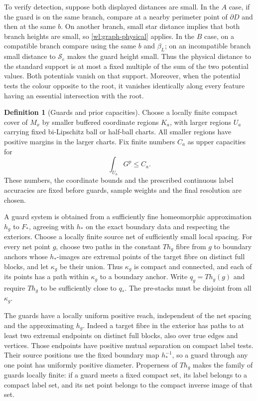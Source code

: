 \documentclass[11pt]{article}
\numberwithin{equation}{section}
\theoremstyle{definition}
\newtheorem{definition}[theorem]{Definition}
\theoremstyle{remark}
\begin{document}
To verify detection, suppose both displayed distances are small.  In
the $A$ case, if the guard is on the same branch, compare at a nearby
perimeter point of $\partial D$ and then at the same $b$.  On another
branch, small star distance implies that both branch heights are
small, so \eqref{wl:graph-physical} applies.  In the $B$ case, on a
compatible branch compare using the same $b$ and $\beta_L$; on an
incompatible branch small distance to $\mathcal S_e$ makes the guard
height small.  Thus the physical distance to the standard support is
at most a fixed multiple of the sum of the two potential values.
Both potentials vanish on that support.  Moreover, when the potential
tests the colour opposite to the root, it vanishes identically along
every feature having an essential intersection with the root.

\begin{definition}[Guards and prior capacities]\label{wl:guards}
Choose a locally finite compact cover of $M_x$ by smaller buffered
coordinate regions $K_a$, with larger regions $U_a$ carrying fixed
bi-Lipschitz ball or half-ball charts.  All smaller regions have
positive margins in the larger charts.  Fix finite numbers $C_a$ as
upper capacities for
\begin{equation}\label{wl:prior-capacity}
 \int_{U_a}G^p\leq C_a.
\end{equation}
These numbers, the coordinate bounds and the prescribed continuous
label accuracies are fixed before guards, sample weights and the
final resolution are chosen.

A guard system is obtained from a sufficiently fine homeomorphic
approximation $h_g$ to $F_*$, agreeing with $h_*$ on the exact boundary
data and respecting the exteriors.  Choose a locally finite source
net of sufficiently small local spacing.  For every net point $g$,
choose two paths in the constant $Th_g$ fibre from $g$ to boundary
anchors whose $h_*$-images are extremal points of the target fibre
on distinct full blocks, and let $\kappa_g$ be their union.  Thus
$\kappa_g$ is compact and connected, and each of its points has a
path within $\kappa_g$ to a boundary anchor.  Write
$q_g=Th_g(g)$ and require $Th_g$ to be sufficiently close to $q_*$.
The pre-stacks must be disjoint from all $\kappa_g$.
\end{definition}

The guards have a locally uniform positive reach, independent of the
net spacing and the approximating $h_g$.  Indeed a target fibre in
the exterior has paths to at least two extremal endpoints on distinct
full blocks, also over true edges and vertices.  Those endpoints have
positive mutual separation on compact label tests.  Their source
positions use the fixed boundary map $h_*^{-1}$, so a guard through
any one point has uniformly positive diameter.  Properness of
$Th_g$ makes the family of guards locally finite: if a guard meets a
fixed compact set, its label belongs to a compact label set, and its
net point belongs to the compact inverse image of that set.
\end{document}
